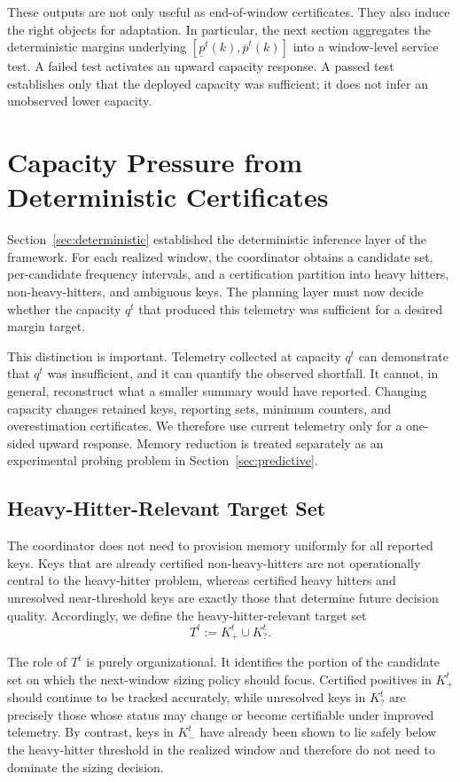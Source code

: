 \documentclass[sigconf, nonacm]{acmart}
\begin{document}
These outputs are not only useful as end-of-window certificates. They also induce the right objects for adaptation. In particular, the next section aggregates the deterministic margins underlying \([\underline p^t(k), \overline p^t(k)]\) into a window-level service test. A failed test activates an upward capacity response. A passed test establishes only that the deployed capacity was sufficient; it does not infer an unobserved lower capacity.

\section{Capacity Pressure from Deterministic Certificates}
\label{sec:requirement}

Section~\ref{sec:deterministic} established the deterministic inference layer of the framework. For each realized window, the coordinator obtains a candidate set, per-candidate frequency intervals, and a certification partition into heavy hitters, non-heavy-hitters, and ambiguous keys. The planning layer must now decide whether the capacity \(q^t\) that produced this telemetry was sufficient for a desired margin target.

This distinction is important. Telemetry collected at capacity \(q^t\) can demonstrate that \(q^t\) was insufficient, and it can quantify the observed shortfall. It cannot, in general, reconstruct what a smaller summary would have reported. Changing capacity changes retained keys, reporting sets, minimum counters, and overestimation certificates. We therefore use current telemetry only for a one-sided upward response. Memory reduction is treated separately as an experimental probing problem in Section~\ref{sec:predictive}.

\subsection{Heavy-Hitter-Relevant Target Set}
\label{subsec:req-target}

The coordinator does not need to provision memory uniformly for all reported keys. Keys that are already certified non-heavy-hitters are not operationally central to the heavy-hitter problem, whereas certified heavy hitters and unresolved near-threshold keys are exactly those that determine future decision quality. Accordingly, we define the heavy-hitter-relevant target set
\[
T^t := K_+^t \cup K_?^t.
\]

The role of \(T^t\) is purely organizational. It identifies the portion of the candidate set on which the next-window sizing policy should focus. Certified positives in \(K_+^t\) should continue to be tracked accurately, while unresolved keys in \(K_?^t\) are precisely those whose status may change or become certifiable under improved telemetry. By contrast, keys in \(K_-^t\) have already been shown to lie safely below the heavy-hitter threshold in the realized window and therefore do not need to dominate the sizing decision.
\end{document}
